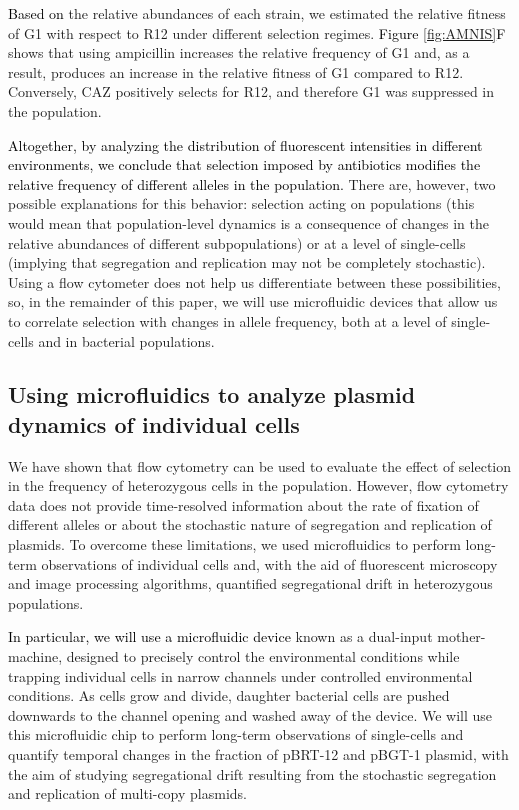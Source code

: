 \documentclass[fleqn,12pt]{wlscirep}
\newcommand{\blue}[1]{\textcolor{black}{#1}}
\newcommand{\fig}[1]{\textcolor{black}{#1}}
\begin{document}
\blue{Based on} the relative abundances of each strain, we estimated the relative fitness of G1 with respect to R12 under different selection regimes.  \fig{Figure \ref{fig:AMNIS}F} shows that using ampicillin increases the relative frequency of G1 and, as a result, produces an increase in the relative fitness of G1 compared to R12.  Conversely, CAZ positively selects for R12, and therefore G1 was suppressed in the population.

\blue{Altogether, by analyzing the distribution of fluorescent intensities in different environments, we conclude that selection imposed by antibiotics modifies the relative frequency of different alleles in the population.} There are, however, two possible explanations for this behavior: selection acting on populations (this would mean that population-level dynamics is a consequence of changes in the relative abundances of different subpopulations) or at a level of single-cells (implying that segregation and replication may not be completely stochastic).  Using a flow cytometer does not help us differentiate between these possibilities, so, in the remainder of this paper, we will use microfluidic devices that allow us to correlate selection with changes in allele frequency, both at a level of single-cells and in bacterial populations.


\subsection{Using microfluidics to analyze plasmid dynamics of individual cells}

We have shown that flow cytometry can be used to evaluate the effect of selection in the frequency of heterozygous cells in the population. However, flow cytometry data does not provide time-resolved information about the rate of fixation of different alleles or about the stochastic nature of segregation and replication of plasmids. To overcome these limitations, we used microfluidics to perform long-term observations of individual cells and, with the aid of fluorescent microscopy and image processing algorithms, quantified segregational drift in heterozygous populations.

\blue{In particular, we will use a microfluidic device} known as a dual-input mother-machine, designed to precisely control the environmental conditions while trapping individual cells in narrow channels under controlled environmental conditions. As cells grow and divide, daughter bacterial cells are pushed downwards to the channel opening and washed away of the device. We will use this microfluidic chip to perform long-term observations of single-cells and quantify temporal changes in the fraction of pBRT-12 and pBGT-1 plasmid, with the aim of studying segregational drift resulting from the stochastic segregation and replication of multi-copy plasmids.
\end{document}

